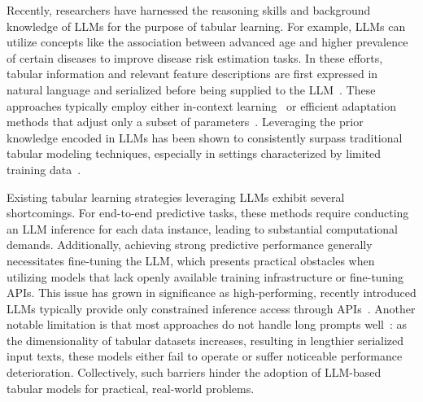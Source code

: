 Recently, researchers have harnessed the reasoning skills and background knowledge of LLMs for the purpose of tabular learning. For example, LLMs can utilize concepts like the association between advanced age and higher prevalence of certain diseases to improve disease risk estimation tasks. In these efforts, tabular information and relevant feature descriptions are first expressed in natural language and serialized before being supplied to the LLM~\cite{dinh2022lift,wang2023anypredict}. These approaches typically employ either in-context learning~\cite{nam2023semi} or efficient adaptation methods that adjust only a subset of parameters~\cite{dinh2022lift,hegselmann2023tabllm}. Leveraging the prior knowledge encoded in LLMs has been shown to consistently surpass traditional tabular modeling techniques, especially in settings characterized by limited training data~\cite{hegselmann2023tabllm}.

Existing tabular learning strategies leveraging LLMs exhibit several shortcomings. For end-to-end predictive tasks, these methods require conducting an LLM inference for each data instance, leading to substantial computational demands. Additionally, achieving strong predictive performance generally necessitates fine-tuning the LLM, which presents practical obstacles when utilizing models that lack openly available training infrastructure or fine-tuning APIs. This issue has grown in significance as high-performing, recently introduced LLMs typically provide only constrained inference access through APIs~\cite{anil2023palm,openai2023gpt4}. Another notable limitation is that most approaches do not handle long prompts well~\cite{liu2023lost}: as the dimensionality of tabular datasets increases, resulting in lengthier serialized input texts, these models either fail to operate or suffer noticeable performance deterioration. Collectively, such barriers hinder the adoption of LLM-based tabular models for practical, real-world problems.

